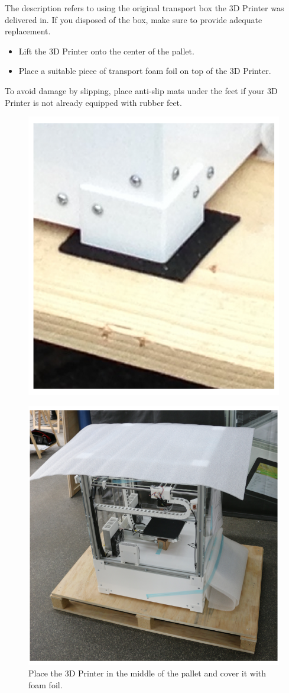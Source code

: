 The description refers to using the original transport box the 3D Printer was delivered in. If you disposed of the box, make sure to provide adequate replacement.

\begin{itemize}
  \item Lift the 3D Printer onto the center of the pallet.
  \item Place a suitable piece of transport foam foil on top of the 3D Printer.
\end{itemize}

\begin{notice}
  To avoid damage by slipping, place anti-slip mats under the feet if your 3D Printer is not already equipped with rubber feet.
  \begin{figure}[H]
    \centering
    \includegraphics[width=.7\linewidth]{./img/packstep3.png}
  \end{figure}
\end{notice}

\begin{figure}[H]
  \centering
  \includegraphics[width=.7\linewidth]{./img/packstep1.png}
  \caption{Place the 3D Printer in the middle of the pallet and cover it with foam foil.}
\end{figure}

